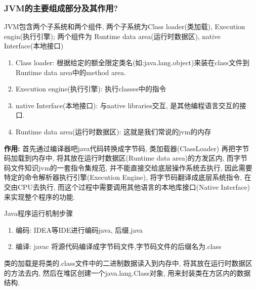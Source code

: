\documentclass[UTF8]{ctexart}
\begin{document}
\subsubsection{JVM的主要组成部分及其作用?}
JVM包含两个子系统和两个组件, 两个子系统为Class loader(类加载), Execution engin(执行引擎); 两个组件为 Runtime data area(运行时数据区), native Interface(本地接口)

\begin{enumerate}
	\item Class loader: 根据给定的额全限定类名(如:java.lang.object)来装在class文件到Runtime data area中的method area.
	\item Execution engine(执行引擎): 执行classes中的指令
	\item native Interface(本地接口): 与native libraries交互, 是其他编程语言交互的接口.
	\item Runtime data area(运行时数据区): 这就是我们常说的jvm的内存
\end{enumerate}
\par
\textbf{作用:} 首先通过编译器吧java代码转换成字节码, 类加载器(ClassLoader) 再把字节码加载到内存中, 将其放在运行时数据区(Runtime data area)的方发区内, 而字节码文件知识jvm的一套指令集规范, 并不能直接交给底层操作系统去执行, 因此需要特定的命令解析器执行引擎(Execution Engine), 将字节码翻译成底层系统指令, 在交由CPU去执行, 而这个过程中需要调用其他语言的本地库接口(Native Interface) 来实现整个程序的功能. 
\par
Java程序运行机制步骤
\begin{enumerate}
	\item 编码: IDEA等IDE进行编码java, 后缀.java
	\item 编译: javac 将源代码编译成字节码文件,字节码文件的后缀名为.class
\end{enumerate}
类的加载是将类的.class文件中的二进制数据读入到内存中, 将其放在运行时数据区的方法去内, 然后在堆区创建一个java.lang.Class对象, 用来封装类在方区内的数据结构.
\end{document}
